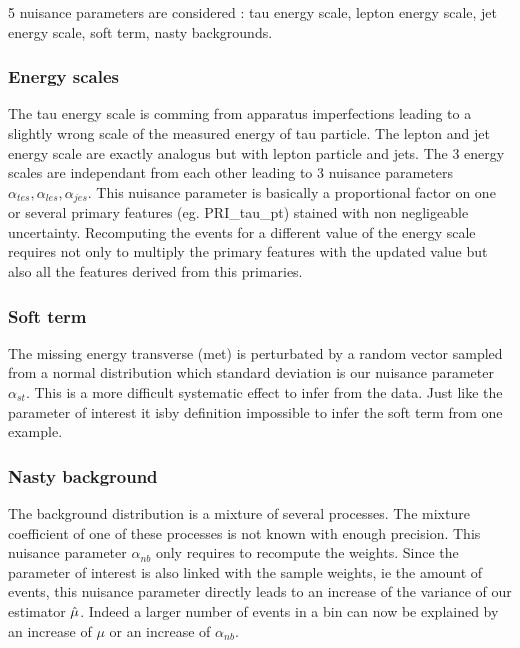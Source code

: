 5 nuisance parameters are considered : tau energy scale, lepton energy scale, jet energy scale, soft term, nasty backgrounds.



\subsubsection{Energy scales} %
\label{ssub:energy_scales}

The tau energy scale is comming from apparatus imperfections leading to a slightly wrong scale of the measured energy of tau particle.
The lepton and jet energy scale are exactly analogus but with lepton particle and jets.
The 3 energy scales are independant from each other leading to 3 nuisance parameters $\alpha_{tes}, \alpha_{les}, \alpha_{jes}$. 
This nuisance parameter is basically a proportional factor on one or several primary features (eg. PRI\_tau\_pt) stained with non negligeable uncertainty.
Recomputing the events for a different value of the energy scale requires not only to multiply the primary features with the updated value but also all the features derived from this primaries.



\subsubsection{Soft term} %
\label{ssub:soft_term}

The missing energy transverse (met) is perturbated by a random vector sampled from a normal distribution which standard deviation is our nuisance parameter $\alpha_{st}$.
This is a more difficult systematic effect to infer from the data.
Just like the parameter of interest it isby definition impossible to infer the soft term from one example.




\subsubsection{Nasty background} %
\label{ssub:nasty_background}

The background distribution is a mixture of several processes.
The mixture coefficient of one of these processes is not known with enough precision.
This nuisance parameter $\alpha_{nb}$ only requires to recompute the weights.
Since the parameter of interest is also linked with the sample weights, ie the amount of events, this nuisance parameter directly leads to an increase of the variance of our estimator $\hat\mu$.
Indeed a larger number of events in a bin can now be explained by an increase of $\mu$ or an increase of $\alpha_{nb}$.




